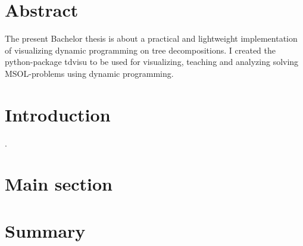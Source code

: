 \documentclass[a4paper, 12pt]{scrartcl}
\begin{document}
\begin{titlepage}
	\begin{center}
		
	\end{center}
\end{titlepage}

\tableofcontents

\newpage

\section{Abstract}
\vspace{4ex}
The present Bachelor thesis is about a practical and lightweight implementation of visualizing dynamic programming on tree decompositions.
I created the python-package tdvisu to be used for visualizing, teaching and analyzing solving MSOL-problems using dynamic programming.
\newpage


\section{Introduction}

\newpage.
\section{Main section}


\section{Summary}

{}

\end{document}
